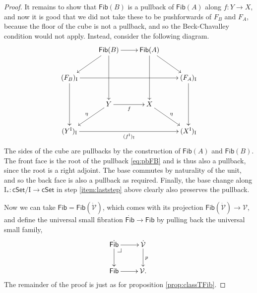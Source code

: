 \documentclass[12pt]{article}
\makeatletter
\newcommand{\cSet}{\ensuremath{\mathsf{cSet}}}
\newcommand{\pbcorner}[1][dr]{\save*!/#1-1.2pc/#1:(-1,1)@^{|-}\restore}
\newcommand{\ra}{\ensuremath{\rightarrow}}
\newcommand{\I}{\ensuremath{\mathrm{I}}}
\newcommand{\V}{\ensuremath{\mathcal{V}}}
\newcommand{\VV}{\ensuremath{\dot{\mathcal{V}}}}
\newcommand{\Fib}{\ensuremath{\mathsf{Fib}}}
\newcommand{\FFib}{\ensuremath{\dot{\mathsf{Fib}}}}
\newtheorem{lemma}[theorem]{Lemma}
\theoremstyle{remark}
\theoremstyle{definition}
\makeatother
\begin{document}
\begin{proof}
It remains to show that $\Fib(B)$ is a pullback of $\Fib(A)$ along $f:Y\ra X$, and now it is good that we did not take these to be pushforwards of $F_B$ and $F_A$, because the floor of the cube is not a pullback, and so the Beck-Chavalley condition would not apply.  Instead, consider the following diagram.
\begin{equation}\label{diagram:fibU10}
\xymatrix{
& \Fib(B) \ar[ld] \ar[dd]  \ar[r] & \Fib(A) \ar[dd] \ar[rd] & \\
(F_B)_\I \ar[dd] \ar[rrr] &&& (F_A)_\I \ar[dd] \\
& Y \ar[ld]_\eta \ar[r]_f & X \ar[rd]^\eta &\\
(Y^\I)_\I \ar[rrr]_{(f^\I)_\I} &&& (X^\I)_\I 
 }
\end{equation}
The sides of the cube are pullbacks by the construction of $\Fib(A)$ and $\Fib(B)$. The front face is the root of the pullback \eqref{eq:pbFB} and is thus also a pullback, since the root is a right adjoint. The base commutes by naturality of the unit, and so the back face is also a pullback as required.  Finally, the base change along $\I_* : \cSet/\I \ra\cSet$ in step \ref{item:laststep} above clearly also preserves the pullback.

Now we can take $\Fib = \Fib(\VV)$, which comes with its projection $\Fib(\VV) \ra \V$, and define the universal small fibration $\FFib\ra\Fib$ by pulling back the universal small family,
\[
\xymatrix{
\FFib \ar[d] \ar[r]  \pbcorner & \VV\ar[d]^p\\
\Fib \ar[r] & \V.
}
\]
The remainder of the proof is just as for proposition \ref{prop:classTFib}.  
\end{proof}

\end{document}
